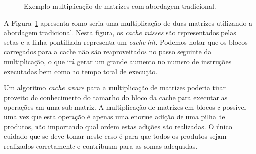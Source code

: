 \begin{figure}[hb]
    \centering
    \caption[Exemplo multiplicação de matrizes]{Exemplo multiplicação de matrizes com abordagem tradicional.}
    \label{fig:multiplicacao_matriz}
\end{figure}

A Figura~\ref{fig:multiplicacao_matriz} apresenta como seria uma multiplicação de duas matrizes utilizando a abordagem tradicional. Nesta figura, os \textit{cache misses} são representados pelas setas e a linha pontilhada representa um \textit{cache hit}. Podemos notar que os blocos carregados para a cache não são reaproveitados no passo seguinte da multiplicação, o que irá gerar um grande aumento no numero de instruções executadas bem como no tempo toral de execução.

Um algoritmo \textit{cache aware} para a multiplicação de matrizes poderia tirar proveito do conhecimento do tamanho do bloco da cache para executar as operações em uma sub-matriz.
A multiplicação de matrizes em blocos é possível uma vez que esta operação é apenas uma enorme adição de uma pilha de produtos, não importando qual ordem estas adições são realizadas.
O único cuidado que se deve tomar neste caso é para que todos os produtos sejam realizados corretamente e contribuam para as somas adequadas.

